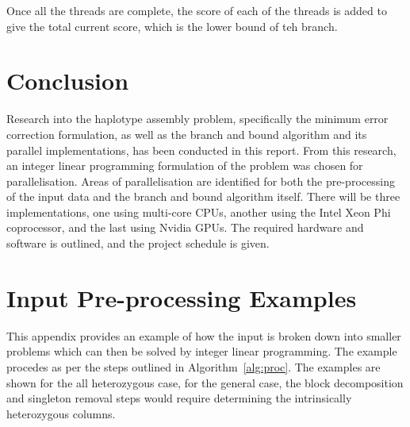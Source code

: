 \documentclass[10pt,twocolumn]{article}
\begin{document}
Once all the threads are complete, the score of each of the threads is added to give the total current score,
which is the lower bound of teh branch.

\section{Conclusion} \label{sec:conc}

Research into the haplotype assembly problem, specifically the minimum error correction formulation, as well
as the branch and bound algorithm and its parallel implementations, has been conducted in this report. From
this research, an integer linear programming formulation of the problem was chosen for parallelisation.
Areas of parallelisation are identified for both the pre-processing of the input data and the branch and bound
algorithm itself. There will be three implementations, one using multi-core CPUs, another using the Intel Xeon
Phi coprocessor, and the last using Nvidia GPUs. The required hardware and software is outlined, and the 
project schedule is given. 




\clearpage 

\appendix

\section{Input Pre-processing Examples } \label{app:inpre}

This appendix provides an example of how the input is broken down into smaller problems which can then be 
solved by integer linear programming. The example procedes as per the steps outlined in
Algorithm~\ref{alg:proc}. The examples are shown for the all heterozygous case, for the general case, the
block decomposition and singleton removal steps would require determining the intrinsically heterozygous
columns.
\end{document}
